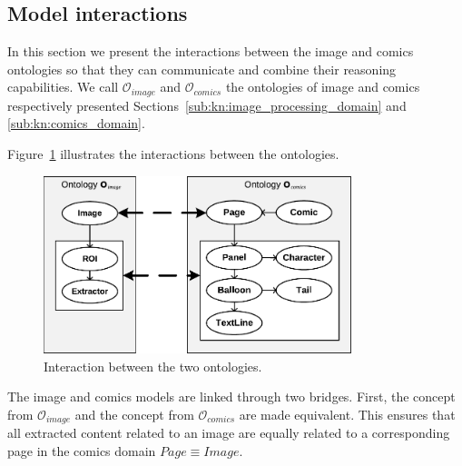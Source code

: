 
\subsection{Model interactions} %
\label{sub:model_interactions}

In this section we present the interactions between the image and comics ontologies so that they can communicate and combine their reasoning capabilities.
We call $\mathcal{O}_{image}$ and $\mathcal{O}_{comics}$ the ontologies of image and comics respectively presented Sections~\ref{sub:kn:image_processing_domain} and \ref{sub:kn:comics_domain}.


Figure~\ref{fig:kn:interactions} illustrates the interactions between the ontologies.

\begin{figure}[h!]
\begin{center}
\includegraphics[width=0.8\textwidth]{interactions.pdf}
\caption{Interaction between the two ontologies.}
\label{fig:kn:interactions}
\end{center}
\end{figure}

The image and comics models are linked through two bridges.
First, the  concept from $\mathcal{O}_{image}$ and the  concept from $\mathcal{O}_{comics}$ are made equivalent.
This ensures that all extracted content related to an image are equally related to a corresponding page in the comics domain $Page \equiv  Image$.

